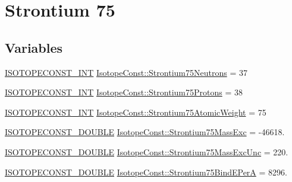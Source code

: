 \hypertarget{group___isotope_const-_strontium-_sr75}{}\section{Strontium 75}
\label{group___isotope_const-_strontium-_sr75}
\subsection*{Variables}
\begin{DoxyCompactItemize}
\item 
\mbox{\hyperlink{group___isotope_const-_macros_ga5f18360b3e99483a35c32d789e62621c}{I\+S\+O\+T\+O\+P\+E\+C\+O\+N\+S\+T\+\_\+\+I\+NT}} \mbox{\hyperlink{group___isotope_const-_strontium-_sr75_ga2df790d04f6f2b98b351d0f37530428f}{Isotope\+Const\+::\+Strontium75\+Neutrons}} = 37
\item 
\mbox{\hyperlink{group___isotope_const-_macros_ga5f18360b3e99483a35c32d789e62621c}{I\+S\+O\+T\+O\+P\+E\+C\+O\+N\+S\+T\+\_\+\+I\+NT}} \mbox{\hyperlink{group___isotope_const-_strontium-_sr75_gae2c95d241014e285fd0d68b3cc1cb367}{Isotope\+Const\+::\+Strontium75\+Protons}} = 38
\item 
\mbox{\hyperlink{group___isotope_const-_macros_ga5f18360b3e99483a35c32d789e62621c}{I\+S\+O\+T\+O\+P\+E\+C\+O\+N\+S\+T\+\_\+\+I\+NT}} \mbox{\hyperlink{group___isotope_const-_strontium-_sr75_gadf55c127e5ef35d2a478bcefd8ab0ba8}{Isotope\+Const\+::\+Strontium75\+Atomic\+Weight}} = 75
\item 
\mbox{\hyperlink{group___isotope_const-_macros_ga8f45a7272ce02c0b4c65c44636ed719a}{I\+S\+O\+T\+O\+P\+E\+C\+O\+N\+S\+T\+\_\+\+D\+O\+U\+B\+LE}} \mbox{\hyperlink{group___isotope_const-_strontium-_sr75_gafa71f90e7b686514819addcc32aae7ce}{Isotope\+Const\+::\+Strontium75\+Mass\+Exc}} = -\/46618.
\item 
\mbox{\hyperlink{group___isotope_const-_macros_ga8f45a7272ce02c0b4c65c44636ed719a}{I\+S\+O\+T\+O\+P\+E\+C\+O\+N\+S\+T\+\_\+\+D\+O\+U\+B\+LE}} \mbox{\hyperlink{group___isotope_const-_strontium-_sr75_gadcd570f7744708b53026f45710acbe8b}{Isotope\+Const\+::\+Strontium75\+Mass\+Exc\+Unc}} = 220.
\item 
\mbox{\hyperlink{group___isotope_const-_macros_ga8f45a7272ce02c0b4c65c44636ed719a}{I\+S\+O\+T\+O\+P\+E\+C\+O\+N\+S\+T\+\_\+\+D\+O\+U\+B\+LE}} \mbox{\hyperlink{group___isotope_const-_strontium-_sr75_ga7d72f9288a7ecdb8022f7ac20239cefc}{Isotope\+Const\+::\+Strontium75\+Bind\+E\+PerA}} = 8296.
\item 

\end{DoxyCompactItemize}

